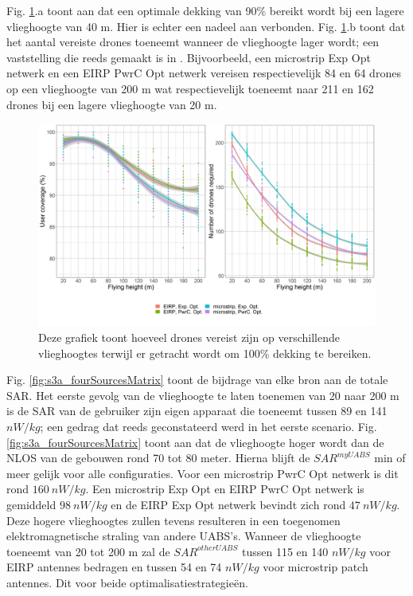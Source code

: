 \documentclass[twocolumn]{phdsymp_dutch}
\begin{document}
Fig. \ref{fig:s3a_numDronesAndCov}.a toont aan dat een optimale dekking van 90\% bereikt wordt bij een lagere vlieghoogte van 40 m.
Hier is echter een nadeel aan verbonden. 
Fig. \ref{fig:s3a_numDronesAndCov}.b 
toont dat het aantal vereiste drones toeneemt wanneer de vlieghoogte lager wordt; 
een vaststelling die reeds gemaakt is in \cite{J2}.
Bijvoorbeeld, een microstrip \gls{Exp Opt} netwerk en een \gls{EIRP} \gls{PwrC Opt} netwerk 
vereisen respectievelijk 84 en 64 drones op een vlieghoogte van 200 m wat respectievelijk toeneemt naar 
211 en 162 drones bij een lagere vlieghoogte van 20 m.

\begin{figure}[]
  \includegraphics[width=\linewidth]{../results/s3/fhvsnumdronesAndCov.png}
  \caption{Deze grafiek toont hoeveel drones vereist zijn op verschillende vlieghoogtes terwijl er getracht wordt om 100\% dekking te bereiken.}
  \label{fig:s3a_numDronesAndCov}
\end{figure}

Fig. \ref{fig:s3a_fourSourcesMatrix} toont de bijdrage van elke bron aan de totale \gls{SAR}.
Het eerste  gevolg van de vlieghoogte te laten toenemen van 20 naar 200 m is de 
  \gls{SAR}  van de gebruiker zijn eigen apparaat die toeneemt tussen 89 en 141 $nW/kg$;
een gedrag dat reeds geconstateerd werd in het eerste scenario.
Fig. \ref{fig:s3a_fourSourcesMatrix} toont aan dat de vlieghoogte hoger wordt dan de \gls{NLOS} van de gebouwen 
rond 70 tot 80 meter. Hierna blijft de $SAR^{myUABS}$ min of meer gelijk voor alle configuraties.
Voor een microstrip \gls{PwrC Opt} netwerk is dit rond  $160\ nW/kg$.
Een microstrip \gls{Exp Opt} en \gls{EIRP} \gls{PwrC Opt} netwerk is gemiddeld $98\ nW/kg$ en
de \gls{EIRP} \gls{Exp Opt} netwerk bevindt zich rond $47\ nW/kg$.
Deze hogere vlieghoogtes zullen tevens resulteren in een toegenomen elektromagnetische straling van andere
\gls{UABS}'s.
Wanneer de vlieghoogte toeneemt van 20 tot 200 m zal de $SAR^{otherUABS}$ tussen 115 en 140
$nW/kg$ voor \gls{EIRP} antennes bedragen en tussen 54 en 74 $nW/kg$ voor microstrip patch antennes.
Dit voor beide optimalisatiestrategie\"en.
\end{document}
